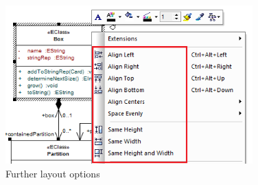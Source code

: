 \begin{enumerate}
\begin{figure}[htbp]
\begin{center}  
  \includegraphics[width=0.85\textwidth]{layoutElements2}
  \caption{Further layout options}  
  \label{fig_layout02} 
\end{center}
\end{figure}

\end{enumerate}

